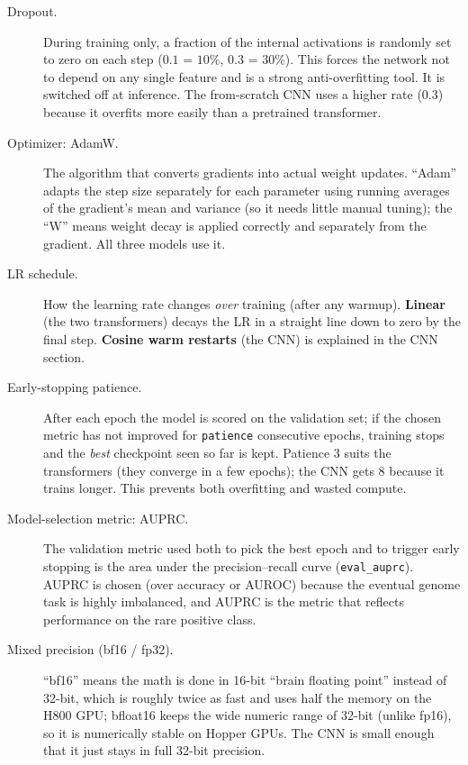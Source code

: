 \documentclass{article}
\begin{document}
\begin{description}
\item[Dropout.] During training only, a fraction of the internal activations is randomly set to zero on each step ($0.1$ = $10\%$, $0.3$ = $30\%$). This forces the network not to depend on any single feature and is a strong anti-overfitting tool. It is switched off at inference. The from-scratch CNN uses a higher rate (0.3) because it overfits more easily than a pretrained transformer.

\item[Optimizer: AdamW.] The algorithm that converts gradients into actual weight updates. ``Adam'' adapts the step size separately for each parameter using running averages of the gradient's mean and variance (so it needs little manual tuning); the ``W'' means weight decay is applied correctly and separately from the gradient. All three models use it.

\item[LR schedule.] How the learning rate changes \emph{over} training (after any warmup). \textbf{Linear} (the two transformers) decays the LR in a straight line down to zero by the final step. \textbf{Cosine warm restarts} (the CNN) is explained in the CNN section.

\item[Early-stopping patience.] After each epoch the model is scored on the validation set; if the chosen metric has not improved for \texttt{patience} consecutive epochs, training stops and the \emph{best} checkpoint seen so far is kept. Patience 3 suits the transformers (they converge in a few epochs); the CNN gets 8 because it trains longer. This prevents both overfitting and wasted compute.

\item[Model-selection metric: AUPRC.] The validation metric used both to pick the best epoch and to trigger early stopping is the area under the precision--recall curve (\texttt{eval\_auprc}). AUPRC is chosen (over accuracy or AUROC) because the eventual genome task is highly imbalanced, and AUPRC is the metric that reflects performance on the rare positive class.

\item[Mixed precision (bf16 / fp32).] ``bf16'' means the math is done in 16-bit ``brain floating point'' instead of 32-bit, which is roughly twice as fast and uses half the memory on the H800 GPU; bfloat16 keeps the wide numeric range of 32-bit (unlike fp16), so it is numerically stable on Hopper GPUs. The CNN is small enough that it just stays in full 32-bit precision.


\end{description}
\end{document}
